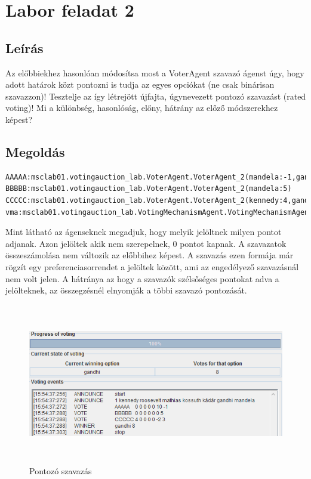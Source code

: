 \section{Labor feladat 2}
\subsection{Leírás}
Az előbbiekhez hasonlóan módosítsa most a VoterAgent szavazó ágenst úgy, hogy adott
határok közt pontozni is tudja az egyes opciókat (ne csak binárisan szavazzon)! Tesztelje az
így létrejött újfajta, úgynevezett pontozó szavazást (rated voting)! Mi a különbség,
hasonlóság, előny, hátrány az előző módszerekhez képest?
\subsection{Megoldás}
\begin{lstlisting}[caption=Pontozó run-config, frame=single,float=!ht]
AAAAA:msclab01.votingauction_lab.VoterAgent.VoterAgent_2(mandela:-1,gandhi:10)
BBBBB:msclab01.votingauction_lab.VoterAgent.VoterAgent_2(mandela:5)
CCCCC:msclab01.votingauction_lab.VoterAgent.VoterAgent_2(kennedy:4,gandhi:-2,mandela:3)
vma:msclab01.votingauction_lab.VotingMechanismAgent.VotingMechanismAgent(voting01.cfg)
\end{lstlisting}
Mint látható az ágenseknek megadjuk, hogy melyik jelöltnek milyen pontot adjanak. Azon jelöltek akik nem szerepelnek, 0 pontot kapnak. A szavazatok összeszámolása nem változik az előbbihez képest. A szavazás ezen formája már rögzít egy preferenciasorrendet a jelöltek között, ami az engedélyező szavazásnál nem volt jelen. A hátránya az hogy a szavazók szélsőséges pontokat adva a jelölteknek, az összegzésnél elnyomják a többi szavazó pontozását.
\begin{figure}[!h]
\begin{center}
\includegraphics[height=7cm]{figures/fel2.png}
\caption{Pontozó szavazás}
\end{center}
\end{figure}

